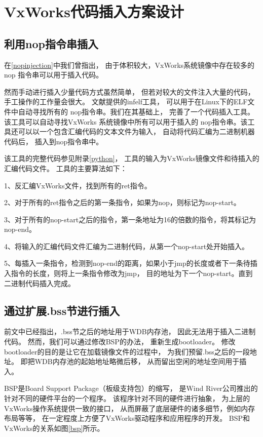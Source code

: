 
\section{VxWorks代码插入方案设计}

\subsection{利用nop指令串插入}

在\ref{nopinjection}中我们曾指出，
由于体积较大，VxWorks系统镜像中存在较多的nop
指令串可以用于插入代码。

然而手动进行插入少量代码方式虽然简单，
但若对较大的文件注入大量的代码，
手工操作的工作量会很大。
文献\cite{infelf}提供的infelf工具，
可以用于在Linux下的ELF文件中自动寻找所有的
nop指令串。我们在其基础上，
完善了一个代码插入工具。
该工具可以自动寻找VxWorks
系统镜像中所有可以用于插入的
nop指令串。该工具还可以以一个包含汇编代码的文本文件为输入，
自动将代码汇编为二进制机器代码后，
插入到nop指令串中。

该工具的完整代码参见附录\ref{python}，
工具的输入为VxWorks镜像文件和待插入的汇编代码文件。
工具的主要算法如下：

1、反汇编VxWorks文件，找到所有的ret指令。

2、对于所有的ret指令之后的第一条指令，如果为nop，则标记为nop-start。

3、对于所有的nop-start之后的指令，第一条地址为16的倍数的指令，将其标记为nop-end。

4、将输入的汇编代码文件汇编为二进制代码，从第一个nop-start处开始插入。

5、每插入一条指令，检测到nop-end的距离，如果小于jmp的长度或者下一条待插入指令的长度，则将上一条指令修改为jmp，
目的地址为下一个nop-start。直到二进制代码插入完成。



\subsection{通过扩展.bss节进行插入}

前文中已经指出，.bss节之后的地址用于WDB内存池，
因此无法用于插入二进制代码。
然而，我们可以通过修改BSP的办法，
重新生成bootloader。
修改bootloader的目的是让它在加载镜像文件的过程中，
为我们预留.bss之后的一段地址。
即把WDB内存池的起始地址略微后移，
从而留出空闲的地址空间用于插入。

BSP是Board Support Package（板级支持包）的缩写，
是Wind River公司推出的针对不同的硬件平台的一个程序。
该程序针对不同的硬件进行抽象，
为上层的VxWorks操作系统提供一致的接口，
从而屏蔽了底层硬件的诸多细节，例如内存布局等等，
在一定程度上方便了VxWorks驱动程序和应用程序的开发。
BSP和VxWorks的关系如图\ref{bsp}所示。


